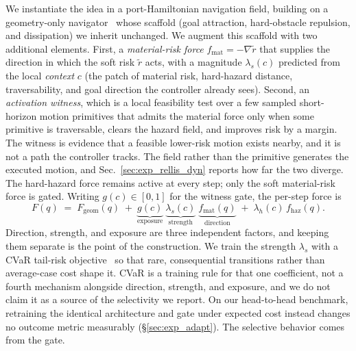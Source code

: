 We instantiate the idea in a port-Hamiltonian navigation field, building on a geometry-only navigator~\citep{ellendula2025grlsnam} whose scaffold (goal attraction, hard-obstacle repulsion, and dissipation) we inherit unchanged. We augment this scaffold with two additional elements. First, a \emph{material-risk force} $f_{\mathrm{mat}}=-\nabla\tilde r$ that supplies the direction in which the soft risk $\tilde r$ acts, with a magnitude $\lambda_s(c)$ predicted from the local \emph{context} $c$ (the patch of material risk, hard-hazard distance, traversability, and goal direction the controller already sees). Second, an \emph{activation witness}, which is a local feasibility test over a few sampled short-horizon motion primitives that admits the material force only when some primitive is traversable, clears the hazard field, and improves risk by a margin. The witness is evidence that a feasible lower-risk motion exists nearby, and it is not a path the controller tracks. The field rather than the primitive generates the executed motion, and Sec.~\ref{sec:exp_rellis_dyn} reports how far the two diverge. The hard-hazard force remains active at every step; only the soft material-risk force is gated. Writing $g(c)\in[0,1]$ for the witness gate, the per-step force is
\begin{equation}
F(q)\;=\;F_{\mathrm{geom}}(q)
\;+\;\underbrace{g(c)}_{\text{exposure}}\;
     \underbrace{\lambda_s(c)}_{\text{strength}}\;
     \underbrace{f_{\mathrm{mat}}(q)}_{\text{direction}}
\;+\;\lambda_h(c)\,f_{\mathrm{haz}}(q).
\label{eq:intro_decomp}
\end{equation}
Direction, strength, and exposure are three independent factors, and keeping them separate is the point of the construction. We train the strength $\lambda_s$ with a CVaR tail-risk objective~\citep{rockafellar2000optimization,chow2015risk} so that rare, consequential transitions rather than average-case cost shape it. CVaR is a training rule for that one coefficient, not a fourth mechanism alongside direction, strength, and exposure, and we do not claim it as a source of the selectivity we report. On our head-to-head benchmark, retraining the identical architecture and gate under expected cost instead changes no outcome metric measurably (\S\ref{sec:exp_adapt}). The selective behavior comes from the gate.


